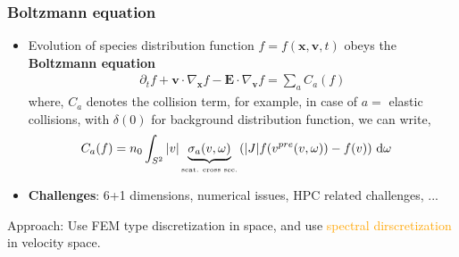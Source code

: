 \documentclass[mathserif, aspectratio=169]{beamer}
\newcommand{\ud}{\,\mathrm{d}}
\newcommand{\vect}[1]{\boldsymbol{#1}}
\begin{document}
	\begin{frame}
		\frametitle{Boltzmann equation}
		\begin{itemize}
			\item Evolution of species distribution function $f = f(\vect{x}, \vect{v}, t)$ obeys the \textbf{Boltzmann equation}
			\small
			\begin{align*}
				\partial_t f + \vect{v}\cdot \nabla_{\vect{x}} f  - \vect{E} \cdot \nabla_{\vect{v }}f = \sum_{a} C_a(f) 
			\end{align*}
			where, $C_a$ denotes the collision term, for example, in case of $a=$ elastic collisions, with $\delta(0)$ for background distribution function, we can write,  
			\begin{align*}
				C_a(f) &= n_0\int_{S^2} |v| \underbrace{\sigma_a(v,\omega)}_{\tiny\text{\tiny scat. cross sec.}} 
				\left(|J|f(v^{pre}(v,\omega)) - f(v) \right) \ud \omega 
			\end{align*}
			\item \textbf{Challenges}: 6+1 dimensions, numerical issues,  HPC related challenges, ...
		\end{itemize}
		Approach: Use FEM type discretization in space, and use \textcolor{orange}{spectral dirscretization} in velocity space.  
	\end{frame}
\end{document}
